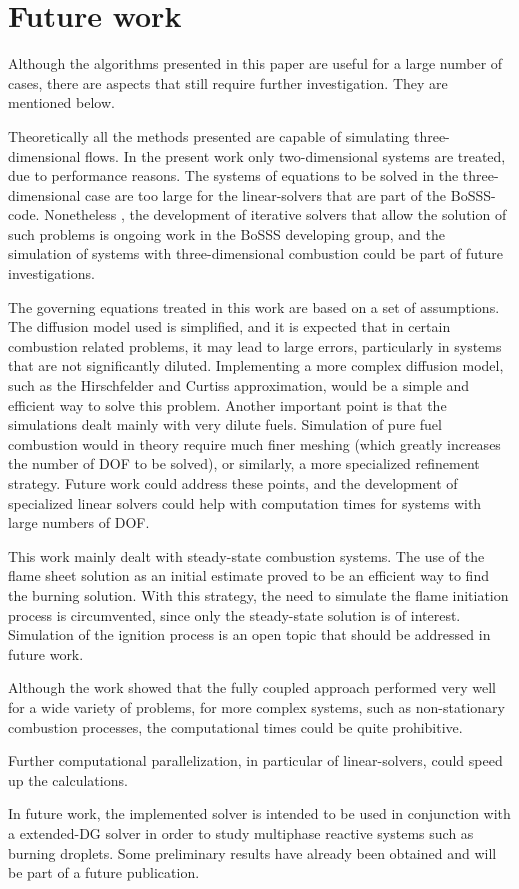 \section{Future work}

Although the algorithms presented in this paper are useful for a large number of cases, there are aspects that still require further investigation. They are mentioned below.

Theoretically all the methods presented are capable of simulating three-dimensional flows. In the present work only two-dimensional systems are treated, due to performance reasons. The systems of equations to be solved in the three-dimensional case are too large for the linear-solvers that are part of the BoSSS-code. Nonetheless , the development of iterative solvers that allow the solution of such problems is ongoing work in the BoSSS developing group, and the simulation of systems with three-dimensional combustion could be part of future investigations.

The governing equations treated in this work are based on a set of assumptions.
The diffusion model used is simplified, and it is expected that in certain combustion related problems, it may lead to large errors, particularly in systems that are not significantly diluted. Implementing a more complex diffusion model, such as the Hirschfelder and Curtiss approximation, would be a simple and efficient way to solve this problem. 
Another important point is that the simulations dealt mainly with very dilute fuels. Simulation of pure fuel combustion would in theory require much finer meshing (which greatly increases the number of DOF to be solved), or similarly, a more specialized refinement strategy. Future work could address these points, and the development of specialized linear solvers could help with computation times for systems with large numbers of DOF.

This work mainly dealt with steady-state combustion systems. The use of the flame sheet solution as an initial estimate proved to be an efficient way to find the burning solution. With this strategy, the need to simulate the flame initiation process is circumvented, since only the steady-state solution is of interest.  Simulation of the ignition process is an open topic that should be addressed in future work. 

Although the work showed that the fully coupled approach performed very well for a wide variety of problems, for more complex systems, such as non-stationary combustion processes, the computational times could be quite prohibitive.


 Further computational parallelization, in particular of linear-solvers, could speed up the calculations. 

In future work, the implemented solver is intended to be used in conjunction with a extended-DG solver \parencite{kummerExtendedDiscontinuousGalerkin2017,kummerBoSSSPackageMultigrid2021,krauseIncompressibleImmersedBoundary2017} in order to study multiphase reactive systems such as burning droplets. Some preliminary results have already been obtained and will be part of a future publication.

